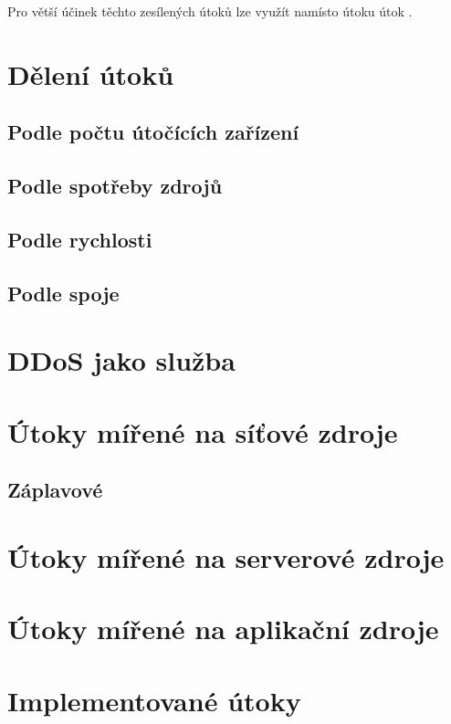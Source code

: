 
Pro větší účinek těchto zesílených útoků lze využít namísto  útoku útok .

\section{Dělení útoků}
\subsection{Podle počtu útočících zařízení}

\subsection{Podle spotřeby zdrojů}

\subsection{Podle rychlosti}

\subsection{Podle spoje}

\section{DDoS jako služba}

\section{Útoky mířené na síťové zdroje}

\subsection{Záplavové}

\section{Útoky mířené na serverové zdroje}

\section{Útoky mířené na aplikační zdroje}

\section{Implementované útoky}

